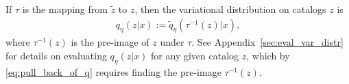 

If $\tau$ is the mapping from $\tilde z$ to $z$,
then the variational distribution on catalogs $z$ is
\begin{align}
    q_\eta(z | x) := \tilde q_\eta(\tau^{-1}(z) | x),
    \label{eq:pull_back_of_q}
\end{align}
where $\tau^{-1}(z)$ is the pre-image of $z$ under $\tau$.
See Appendix~\ref{sec:eval_var_distr} for details on evaluating $q_\eta(z | x)$ for any given catalog $z$, which by \eqref{eq:pull_back_of_q} requires finding the pre-image $\tau^{-1}(z)$.








